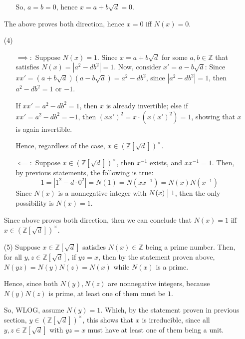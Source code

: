 \documentclass{article}
\begin{document}
\begin{itemize}
\begin{itemize}
        So, $a=b=0$, hence $x=a+b\sqrt{d}=0$.
    \end{itemize}

    The above proves both direction, hence $x=0$ iff $N(x)=0$.

    \hfil

    \item[(4)] \begin{itemize}
        \item[$\implies:$] Suppose $N(x)=1$. Since $x=a+b\sqrt{d}$ for some $a,b\in\mathbb{Z}$ that satisfies $N(x)=|a^2-db^2|=1$. 
        Now, consider $x'=a-b\sqrt{d}$: Since $xx' = (a+b\sqrt{d})(a-b\sqrt{d})=a^2-db^2$, since $|a^2-db^2|=1$, then $a^2-db^2=1$ or $-1$.

        If $xx'=a^2-db^2=1$, then $x$ is already invertible; else if $xx'=a^2-db^2=-1$, then $(xx')^2 = x\cdot (x(x')^2)=1$, showing that $x$ is again invertible.

        Hence, regardless of the case, $x\in(\mathbb{Z}[\sqrt{d}])^\times$.

        \item[$\impliedby:$] Suppose $x\in (\mathbb{Z}[\sqrt{d}])^\times$, then $x^{-1}$ exists, and $xx^{-1}=1$.
        Then, by previous statements, the following is true:
        $$1=|1^2-d\cdot 0^2|=N(1)=N(xx^{-1})=N(x)N(x^{-1})$$
        Since $N(x)$ is a nonnegative integer with $N(x)\bigm | 1$, then the only possibility is $N(x)=1$.
    \end{itemize}

    Since above proves both direction, then we can conclude that $N(x)=1$ iff $x\in(\mathbb{Z}[\sqrt{d}])^\times$.

    \hfil

    \item[(5)] Suppose $x\in\mathbb{Z}[\sqrt{d}]$ satisfies $N(x)\in\mathbb{Z}$ being a prime number. Then, for all $y,z\in\mathbb{Z}[\sqrt{d}]$,
    if $yz = x$, then by the statement proven above, $N(yz)=N(y)N(z)=N(x)$ while $N(x)$ is a prime.

    Hence, since both $N(y),N(z)$ are nonnegative integers, because $N(y)N(z)$ is prime, at least one of them must be $1$.

    So, WLOG, assume $N(y)=1$. Which, by the statement proven in previous section, $y\in (\mathbb{Z}[\sqrt{d}])^\times$, this shows that $x$ is irreducible,
    since all $y,z\in\mathbb{Z}[\sqrt{d}]$ with $yz = x$ must have at least one of them being a unit.
\end{itemize}
\end{document}
